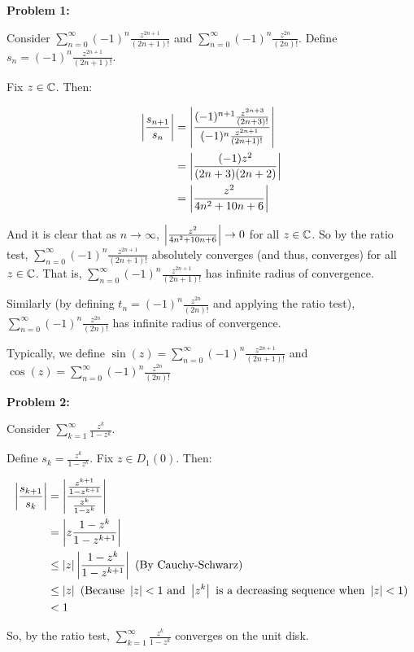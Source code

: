 \documentclass[a4paper,12pt]{article}
\begin{document}
{\bf Problem 1:}

Consider $\sum\limits_{n=0}^\infty (-1)^n \frac{z^{2n+1}}{(2n+1)!}$ and $\sum\limits_{n=0}^\infty (-1)^n \frac{z^{2n}}{(2n)!}$. Define $s_n = (-1)^n \frac{z^{2n+1}}{(2n+1)!}$. 

Fix $z \in \mathbb{C}$. Then:

\begin{align*}
\left\lvert \frac{s_{n+1}}{s_n} \right\rvert &= \left\lvert \frac{(-1)^{n+1} \frac{z^{2n+3}}{(2n+3)!}}{(-1)^n \frac{z^{2n+1}}{(2n+1)!}} \right\rvert\\
&= \left\lvert \frac{(-1)z^{2}}{(2n+3)(2n+2)} \right\rvert\\
&= \left\lvert \frac{z^2}{4n^2+10n+6} \right\rvert\\
\end{align*}

And it is clear that as $n \to \infty$, $\left\lvert \frac{z^2}{4n^2+10n+6} \right\rvert \to 0$ for all $z \in \mathbb{C}$. So by the ratio test, $\sum\limits_{n=0}^\infty (-1)^n \frac{z^{2n+1}}{(2n+1)!}$ absolutely converges (and thus, converges) for all $z \in \mathbb{C}$. That is, $\sum\limits_{n=0}^\infty (-1)^n \frac{z^{2n+1}}{(2n+1)!}$ has infinite radius of convergence.

Similarly (by defining $t_n = (-1)^n \frac{z^{2n}}{(2n)!}$ and applying the ratio test), $\sum\limits_{n=0}^\infty (-1)^n \frac{z^{2n}}{(2n)!}$ has infinite radius of convergence.

Typically, we define $\sin(z) = \sum\limits_{n=0}^\infty (-1)^n \frac{z^{2n+1}}{(2n+1)!}$ and $\cos(z) = \sum\limits_{n=0}^\infty (-1)^n \frac{z^{2n}}{(2n)!}$

\shunt

{\bf Problem 2:}

Consider $\sum\limits_{k=1}^\infty \frac{z^k}{1-z^k}$.

Define $s_k = \frac{z^k}{1-z^k}$. Fix $z \in D_1(0)$. Then:

\begin{align*}
\left\lvert \frac{s_{k+1}}{s_k} \right\rvert &= \left\lvert \frac{\frac{z^{k+1}}{1-z^{k+1}}}{\frac{z^k}{1-z^k}} \right\rvert\\
&= \left\lvert z\frac{1-z^k}{1-z^{k+1}} \right\rvert\\
&\leq \left\lvert z \right\rvert\left\lvert \frac{1-z^k}{1-z^{k+1}} \right\rvert \text{     (By Cauchy-Schwarz)}\\
&\leq \left\lvert z \right\rvert \text{     (Because } \left\lvert z \right\rvert < 1\text{ and } \left\lvert z^k \right\rvert \text{ is a decreasing sequence when } \left\lvert z \right\rvert < 1)\\
&< 1
\end{align*}

So, by the ratio test, $\sum\limits_{k=1}^\infty \frac{z^k}{1-z^k}$ converges on the unit disk. 
\end{document}
